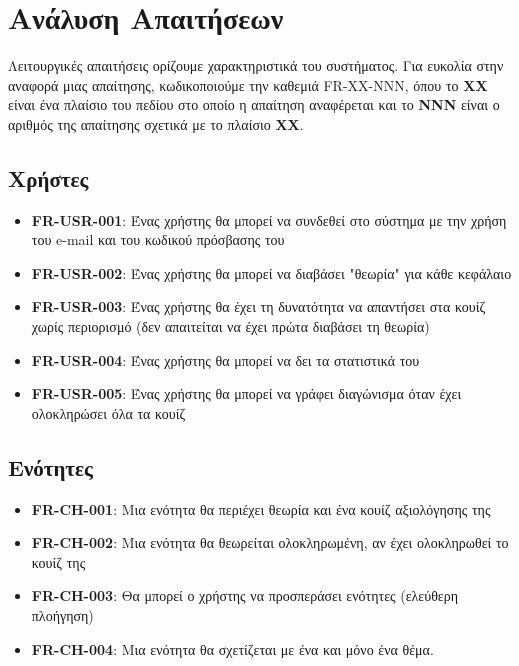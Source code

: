 \section{Ανάλυση Απαιτήσεων}
Λειτουργικές απαιτήσεις ορίζουμε χαρακτηριστικά του συστήματος. Για ευκολία στην αναφορά μιας απαίτησης, κωδικοποιούμε την καθεμιά \textlatin{FR-XX-NNN}, όπου το \textbf{ΧΧ} είναι ένα πλαίσιο του πεδίου στο οποίο η απαίτηση αναφέρεται και το \textbf{NNN} είναι ο αριθμός της απαίτησης σχετικά με το πλαίσιο \textbf{ΧΧ}.

\subsection{Χρήστες}
\begin{itemize}
    \item \textbf{\textlatin{FR-USR-001}}: Ένας χρήστης θα μπορεί να συνδεθεί στο σύστημα με την χρήση του \textlatin{e-mail} και του κωδικού πρόσβασης του
    \item \textbf{\textlatin{FR-USR-002}}: Ένας χρήστης θα μπορεί να διαβάσει "θεωρία" για κάθε κεφάλαιο
    \item \textbf{\textlatin{FR-USR-003}}: Ένας χρήστης θα έχει τη δυνατότητα να απαντήσει στα κουίζ χωρίς περιορισμό (δεν απαιτείται να έχει πρώτα διαβάσει τη θεωρία)
    \item \textbf{\textlatin{FR-USR-004}}: Ένας χρήστης θα μπορεί να δει τα στατιστικά του
    \item \textbf{\textlatin{FR-USR-005}}: Ένας χρήστης θα μπορεί να γράφει διαγώνισμα όταν έχει ολοκληρώσει όλα τα κουίζ
\end{itemize}

\subsection{Ενότητες}
\begin{itemize}
    \item \textbf{\textlatin{FR-CH-001}}: Μια ενότητα θα περιέχει θεωρία και ένα κουίζ αξιολόγησης της
    \item \textbf{\textlatin{FR-CH-002}}: Μια ενότητα θα θεωρείται ολοκληρωμένη, αν έχει ολοκληρωθεί το κουίζ της
    \item \textbf{\textlatin{FR-CH-003}}: Θα μπορεί ο χρήστης να προσπεράσει ενότητες (ελεύθερη πλοήγηση)
    \item \textbf{\textlatin{FR-CH-004}}: Μια ενότητα θα σχετίζεται με ένα και μόνο ένα θέμα.
\end{itemize}

